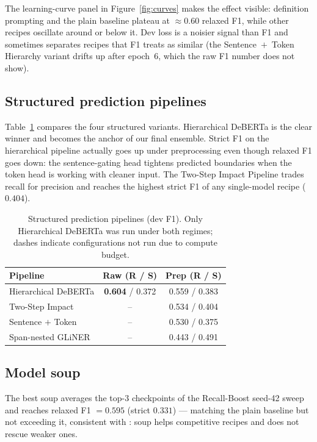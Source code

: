 \documentclass[11pt]{article}
\begin{document}
The learning-curve panel in Figure~\ref{fig:curves} makes the effect
visible: definition prompting and the plain baseline plateau at
$\approx 0.60$ relaxed F1, while other recipes oscillate around or
below it. Dev loss is a noisier signal than F1 and sometimes separates
recipes that F1 treats as similar (the Sentence~$+$~Token Hierarchy
variant drifts up after epoch~6, which the raw F1 number does not show).

\subsection{Structured prediction pipelines}

Table~\ref{tab:pipelines} compares the four structured variants.
Hierarchical DeBERTa is the clear winner and becomes the anchor of our
final ensemble. Strict F1 on the hierarchical pipeline actually goes up
under preprocessing even though relaxed F1 goes down: the
sentence-gating head tightens predicted boundaries when the token head
is working with cleaner input. The Two-Step Impact Pipeline trades
recall for precision and reaches the highest strict F1 of any
single-model recipe ($0.404$).

\begin{table}[t]
\centering\small
\begin{tabular}{l cc}
\toprule
Pipeline & Raw (R / S) & Prep (R / S) \\
\midrule
Hierarchical DeBERTa    & \textbf{0.604} / 0.372 & 0.559 / 0.383 \\
Two-Step Impact         & -- & 0.534 / 0.404 \\
Sentence $+$ Token      & -- & 0.530 / 0.375 \\
Span-nested GLiNER      & -- & 0.443 / 0.491 \\
\bottomrule
\end{tabular}
\caption{Structured prediction pipelines (dev F1). Only Hierarchical
DeBERTa was run under both regimes; dashes indicate configurations not
run due to compute budget.}
\label{tab:pipelines}
\end{table}

\subsection{Model soup}

The best soup averages the top-$3$ checkpoints of the Recall-Boost
seed-42 sweep and reaches relaxed F1 $=0.595$ (strict $0.331$) ---
matching the plain baseline but not exceeding it, consistent with
\citet{wortsman2022modelsoup}: soup helps competitive recipes and does
not rescue weaker ones.
\end{document}

